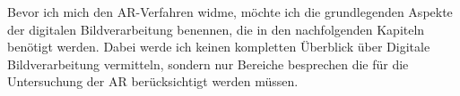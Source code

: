 Bevor ich mich den \gls{AR}-Verfahren widme, möchte ich die grundlegenden Aspekte der digitalen Bildverarbeitung
 benennen, die in den nachfolgenden Kapiteln benötigt werden. Dabei werde ich keinen kompletten Überblick über Digitale
 Bildverarbeitung vermitteln, sondern nur Bereiche besprechen die für die Untersuchung der \gls{AR} berücksichtigt
 werden müssen.

% 
% 	
% 
% 
% 
% 

